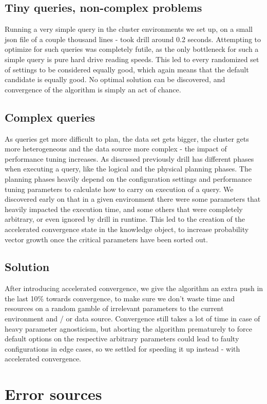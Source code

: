 \documentclass[a4paper,english]{report}
\begin{document}
		\subsection{Tiny queries, non-complex problems}
		Running a very simple query in the cluster environments we set up, on a small json file of a couple thousand lines - took drill around 0.2 seconds. Attempting to optimize for such queries was completely futile, as the only bottleneck for such a simple query is pure hard drive reading speeds. This led to every randomized set of settings to be considered equally good, which again means that the default candidate is equally good. No optimal solution can be discovered, and convergence of the algorithm is simply an act of chance.
		\pagebreak
		\subsection{Complex queries}
		As queries get more difficult to plan, the data set gets bigger, the cluster gets more heterogeneous and the data source more complex - the impact of performance tuning increases. As discussed previously drill has different phases when executing a query, like the logical and the physical planning phases. The planning phases heavily depend on the configuration settings and performance tuning parameters to calculate how to carry on execution of a query. We discovered early on that in a given environment there were some parameters that heavily impacted the execution time, and some others that were completely arbitrary, or even ignored by drill in runtime. This led to the creation of the accelerated convergence state in the knowledge object, to increase probability vector growth once the critical parameters have been sorted out.
		\subsection{Solution}
		After introducing accelerated convergence, we give the algorithm an extra push in the last 10\% towards convergence, to make sure we don't waste time and resources on a random gamble of irrelevant parameters to the current environment and / or data source. Convergence still takes a lot of time in case of heavy parameter agnosticism, but aborting the algorithm prematurely to force default options on the respective arbitrary parameters could lead to faulty configurations in edge cases, so we settled for speeding it up instead - with accelerated convergence.
		\clearpage
	\section{Error sources}
\end{document}
